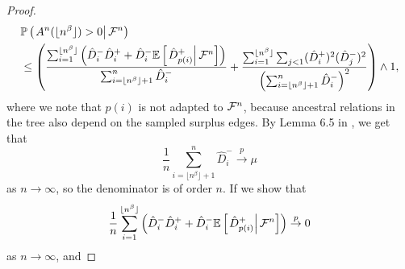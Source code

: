 \begin{proof}
\begin{align*}&{\mathbb P}\left(\left.A^n(\lfloor n^\beta \rfloor)>0\right| {\mathcal F}^n \right)\\&\leq \left(\frac{\sum_{i=1}^{\lfloor n^\beta \rfloor} \left(\hat{D}^-_i\hat{D}^+_i+\hat{D}^-_i{\mathbb E}\left[\left.\hat{D}^+_{p(i)}\right|{\mathcal F}^n\right] \right)}{\sum_{i=\lfloor n^\beta \rfloor+1}^n \hat{D}^-_i}+\frac{\sum_{i=1}^{\lfloor n^\beta \rfloor}\sum_{j<1} (\hat{D}^+_i)^2 (\hat{D}^-_j)^2 }{\left(\sum_{i=\lfloor n^\beta \rfloor+1}^n \hat{D}^-_i\right)^2 }\right)\wedge 1,\end{align*}
where we note that $p(i)$ is not adapted to ${\mathcal F}^n$, because ancestral relations in the tree also depend on the sampled surplus edges. By Lemma 6.5 in \cite{Conchon2018}, we get that 
$$\frac{1}{n}\sum_{i=\lfloor n^\beta \rfloor+1}^n \hat{D}^-_i\overset{p}{\to}\mu$$
as $n\to \infty$, so the denominator is of order $n$. If we show that $$\frac{1}{n}\sum_{i=1}^{\lfloor n^\beta \rfloor} \left(\hat{D}^-_i\hat{D}^+_i+\hat{D}^-_i{\mathbb E}\left[\left.\hat{D}^+_{p(i)}\right|{\mathcal F}^n \right]\right)\overset{p}{\to}0$$
as $n\to\infty$, and 


\end{proof}
